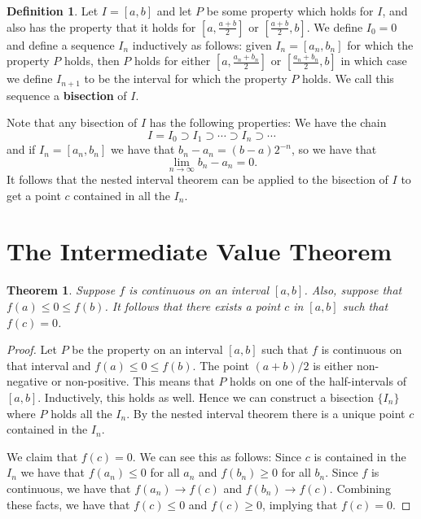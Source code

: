 \documentclass[12pt]{article}
\theoremstyle{definition}
\newtheorem{defn}{Definition}
\theoremstyle{plain}
\newtheorem{thm}{Theorem}
\begin{document}
\begin{defn}
	Let $I = [a, b]$ and let $P$ be some property which holds for $I$, and also has the property that it holds for $\left[a, \frac{a + b}{2}\right]$ or $\left[\frac{a + b}{2}, b\right]$. We define $I_0 = 0$ and define a sequence $I_n$ inductively as follows: given $I_n = [a_n, b_n]$ for which the property $P$ holds, then $P$ holds for either $\left[a, \frac{a_n + b_n}{2}\right]$ or $\left[\frac{a_n + b_n}{2}, b\right]$ in which case we define $I_{n + 1}$ to be the interval for which the property $P$ holds. We call this sequence a \textbf{bisection} of $I$.
\end{defn}

Note that any bisection of $I$ has the following properties: We have the chain
\[I = I_0 \supset I_1 \supset \cdots \supset I_n \supset \cdots\]
and if $I_n = [a_n, b_n]$ we have that $b_n - a_n = (b-a)2^{-n}$, so we have that 
\[\lim_{n \to \infty}b_n - a_n = 0.\] It follows that the nested interval theorem can be applied to the bisection of $I$ to get a point $c$ contained in all the $I_n$.

\section{The Intermediate Value Theorem}

\begin{thm}
Suppose $f$ is continuous on an interval $[a, b]$. Also, suppose that $f(a) \leq 0 \leq f(b)$. It follows that there exists a point $c$ in $[a, b]$ such that $f(c) = 0$.
\end{thm}

\begin{proof}
Let $P$ be the property on an interval $[a, b]$ such that $f$ is continuous on that interval and $f(a) \leq 0 \leq f(b)$. The point $(a + b)/2$ is either non-negative or non-positive. This means that $P$ holds on one of the half-intervals of $[a,b]$. Inductively, this holds as well. Hence we can construct a bisection $\{I_n\}$ where $P$ holds all the $I_n$. By the nested interval theorem there is a unique point $c$ contained in the $I_n$.

We claim that $f(c) = 0$. We can see this as follows: Since $c$ is contained in the $I_n$ we have that $f(a_n) \leq 0$ for all $a_n$ and $f(b_n) \geq 0$ for all $b_n$. Since $f$ is continuous, we have that $f(a_n) \to f(c)$ and $f(b_n) \to f(c)$. Combining these facts, we have that $f(c) \leq 0$ and $f(c) \geq 0$, implying that $f(c) = 0$.
\end{proof}
\end{document}
